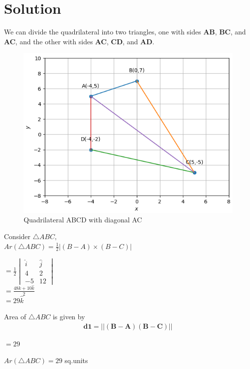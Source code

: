 \documentclass[journal,12pt,twocolumn]{IEEEtran}
\begin{document}
\section{Solution}
\raggedright 
\vspace{0.25cm}
We can divide the quadrilateral into two triangles, one with sides \textbf{AB}, \textbf{BC}, and \textbf{AC}, and the other with sides \textbf{AC}, \textbf{CD}, and \textbf{AD}.
\begin{figure}[h]
\centering
\includegraphics[scale=0.35]{diagnol.png}
\centering
\caption{Quadrilateral ABCD with diagonal AC}
\end{figure}

Consider $ \triangle ABC, $
\vspace{0.2cm}
\boldmath
\\ $ Ar(\triangle ABC)= \frac{1}{2}|(B-A)\times (B-C)| $
\unboldmath
\begin{center}
$ = \frac{1}{2} \begin{vmatrix}
                    \hat{i} & \hat{j}\\
                    4 & 2\\
                   -5 & 12
                   \end{vmatrix} $
\vspace{0.4cm}
\\$ = \frac{48\hat{k}+10\hat{k}}{2}   $
\vspace{0.2cm}
\\$ = 29\hat{k}  $
\end{center}
\vspace{0.2cm}
\raggedright
Area of 
$\triangle ABC$ is given by
\begin{eqnarray}
\boldsymbol{d1} = ||\boldsymbol{(B-A)}\boldsymbol{(B-C)}||
\end{eqnarray}
\begin{center}
$ = 29 $
\end{center}
\vspace{0.2cm}
\raggedright
$ Ar(\triangle ABC)= 29 $ sq.units 
\end{document}
